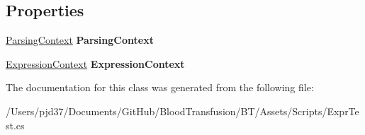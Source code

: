 \subsection*{Properties}
\begin{DoxyCompactItemize}
\item 
\hyperlink{class_b83_1_1_logic_expression_parser_1_1_parsing_context}{Parsing\+Context} {\bfseries Parsing\+Context}\hypertarget{class_b83_1_1_logic_expression_parser_1_1_parser_a55b99a282948b4fbc1badb3a95688dcf}{}\label{class_b83_1_1_logic_expression_parser_1_1_parser_a55b99a282948b4fbc1badb3a95688dcf}

\item 
\hyperlink{class_b83_1_1_logic_expression_parser_1_1_expression_context}{Expression\+Context} {\bfseries Expression\+Context}\hypertarget{class_b83_1_1_logic_expression_parser_1_1_parser_aadd0637d9f838837c468ec7f8d86f0f2}{}\label{class_b83_1_1_logic_expression_parser_1_1_parser_aadd0637d9f838837c468ec7f8d86f0f2}

\end{DoxyCompactItemize}


The documentation for this class was generated from the following file\+:\begin{DoxyCompactItemize}
\item 
/\+Users/pjd37/\+Documents/\+Git\+Hub/\+Blood\+Transfusion/\+B\+T/\+Assets/\+Scripts/Expr\+Test.\+cs\end{DoxyCompactItemize}
